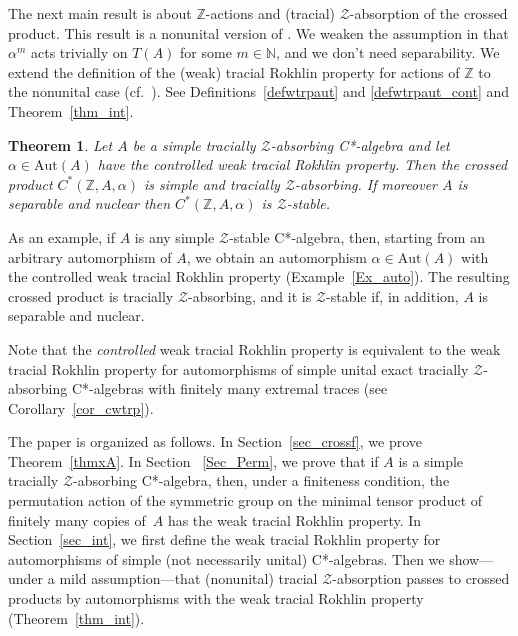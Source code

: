 \documentclass[11pt]{amsart}
\theoremstyle{plain}
\newtheorem{thmx}{Theorem}
\theoremstyle{definition}
\theoremstyle{remark}
\numberwithin{equation}{section}
\begin{document}
\medskip
The next main result is about $\mathbb{Z}$-actions
and (tracial) $\mathcal{Z}$-absorption of the crossed 
product. This result is a nonunital version
of \cite[Theorem 6.7]{HO13}.
We weaken
the assumption in \cite[Theorem 6.7]{HO13}
that $\alpha^{m}$ acts trivially on $T (A)$ for some
$m \in \mathbb{N}$,
and we don't need separability.
We extend the definition of the (weak) tracial Rokhlin property
for actions of
$\mathbb{Z}$ to the nonunital case (cf.~\cite[Definition~1.1]{OP06}).
See Definitions~\ref{defwtrpaut} and \ref{defwtrpaut_cont}
and Theorem~\ref{thm_int}.


\begin{thmx}\label{thmxD}
Let $A$ be a simple tracially $\mathcal{Z}$-absorbing C*-algebra and let
$\alpha \in \mathrm{Aut} (A)$ have the controlled weak tracial
Rokhlin property.
Then the crossed product $C^{*} (\mathbb{Z}, A, \alpha)$ is    simple and
tracially $\mathcal{Z}$-absorbing.
If moreover $A$ is separable and nuclear
 then   $C^{*} (\mathbb{Z}, A, \alpha)$ is $\mathcal{Z}$-stable.
\end{thmx}

As an example, if $A$ is any simple $\mathcal{Z}$-stable C*-algebra,
 then, starting from an arbitrary automorphism  of $A$,
we obtain an automorphism $\alpha \in \mathrm{Aut} (A)$
with the controlled weak tracial 
Rokhlin property (Example~\ref{Ex_auto}). The resulting 
crossed product is tracially $\mathcal{Z}$-absorbing,
and it is  $\mathcal{Z}$-stable if, in addition, $A$ is separable and nuclear.

\medskip

Note that 
the \emph{controlled} weak tracial
Rokhlin property is equivalent to
the weak tracial
Rokhlin property for automorphisms of 
simple unital exact
tracially $\mathcal{Z}$-absorbing C*-algebras
with finitely many extremal traces
(see Corollary~\ref{cor_cwtrp}).
\medskip


The  paper is organized as follows.
In Section~\ref{sec_crossf},
we prove Theorem~\ref{thmxA}.
In Section ~\ref{Sec_Perm},
we prove that if $A$
is a simple tracially $\mathcal{Z}$-absorbing C*-algebra,
then, under a finiteness condition,
the permutation action of the symmetric group
on the minimal tensor product of finitely many copies of~$A$
has the weak tracial Rokhlin property.
In Section~\ref{sec_int}, we first
define the weak tracial Rokhlin property for automorphisms
of simple (not necessarily unital) C*-algebras.
Then we show---under a mild assumption---that (nonunital)
tracial $\mathcal{Z}$-absorption passes to
crossed products by automorphisms
with the weak tracial Rokhlin property (Theorem~\ref{thm_int}).
\end{document}
